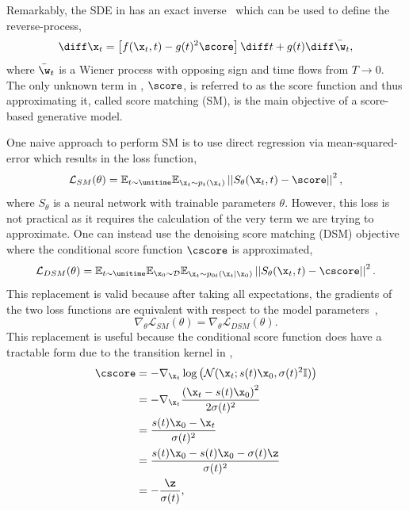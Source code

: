 Remarkably, the SDE in  has an exact inverse~\cite{ReversetimeDiffusionEquation} which can be used to define the reverse-process,
\begin{equation}
    \label{eq:reverse_sde}
    \diff \x_t = \left[ f(\x_t, t) - g(t)^2 \score \right] \diff t + g(t) \diff \bar\w_t,
\end{equation}
where $\bar\w_t$ is a Wiener process with opposing sign and time flows from $T \rightarrow 0$.
The only unknown term in , $\score$, is referred to as the score function and thus approximating it, called score matching (SM), is the main objective of a score-based generative model.

One naive approach to perform SM is to use direct regression via mean-squared-error which results in the loss function,
\begin{equation}
    \label{eq:naive_loss}
    \mathcal{L}_{SM}(\theta) =
    \mathbb{E}_{t \sim \unitime}
    \mathbb{E}_{\x_t \sim p_t(\x_t)}
    \left|\left|S_\theta(\x_t, t) - \score\right|\right|^2,
\end{equation}
where $S_\theta$ is a neural network with trainable parameters $\theta$.
However, this loss is not practical as it requires the calculation of the very term we are trying to approximate.
One can instead use the denoising score matching (DSM) objective~\cite{ScoreMatching, SlicedScoreMatching} where the conditional score function $\cscore$ is approximated,
\begin{equation}
    \label{eq:denoising_loss}
    \mathcal{L}_{DSM}(\theta) =
    \mathbb{E}_{t \sim \unitime}
    \mathbb{E}_{\x_0 \sim \mathcal{D}}
    \mathbb{E}_{\x_t \sim p_{0t}(\x_t|\x_0)}
    \left|\left|S_\theta(\x_t, t) - \cscore\right|\right|^2.
\end{equation}
This replacement is valid because after taking all expectations, the gradients of the two loss functions are equivalent with respect to the model parameters~\cite{ScoreBasedGenerativeModeling},
\begin{equation}
    \nabla_{\theta} \mathcal{L}_{SM}(\theta) = \nabla_{\theta} \mathcal{L}_{DSM}(\theta).
\end{equation}
This replacement is useful because the conditional score function does have a tractable form due to the transition kernel in ,
\begin{equation}
    \begin{aligned}
        \label{eq:conditional_score}
        \cscore
         & = -\nabla_{\x_t} \log \left( \mathcal{N}(\x_t; s(t)\x_0, \sigma(t)^2 \mathbb{I}) \right) \\
         & = -\nabla_{\x_t} \frac{\left(\x_t - s(t)\x_0\right)^2}{2\sigma(t)^2}                     \\
         & = \frac{s(t)\x_0 - \x_t}{\sigma(t)^2}                                                    \\
         & = \frac{s(t)\x_0 - s(t)\x_0 - \sigma(t)\z}{\sigma(t)^2}                                  \\
         & = - \frac{\z}{\sigma(t)},
    \end{aligned}
\end{equation}
